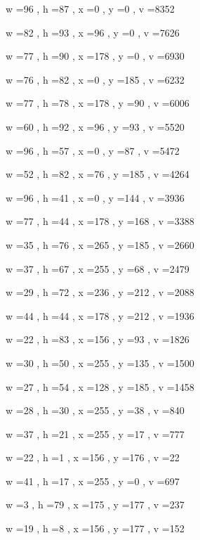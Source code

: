 \documentclass[11pt]{article}
\begin{document}
w =96 , h =87 , x =0 , y =0 , v =8352
\par
w =82 , h =93 , x =96 , y =0 , v =7626
\par
w =77 , h =90 , x =178 , y =0 , v =6930
\par
w =76 , h =82 , x =0 , y =185 , v =6232
\par
w =77 , h =78 , x =178 , y =90 , v =6006
\par
w =60 , h =92 , x =96 , y =93 , v =5520
\par
w =96 , h =57 , x =0 , y =87 , v =5472
\par
w =52 , h =82 , x =76 , y =185 , v =4264
\par
w =96 , h =41 , x =0 , y =144 , v =3936
\par
w =77 , h =44 , x =178 , y =168 , v =3388
\par
w =35 , h =76 , x =265 , y =185 , v =2660
\par
w =37 , h =67 , x =255 , y =68 , v =2479
\par
w =29 , h =72 , x =236 , y =212 , v =2088
\par
w =44 , h =44 , x =178 , y =212 , v =1936
\par
w =22 , h =83 , x =156 , y =93 , v =1826
\par
w =30 , h =50 , x =255 , y =135 , v =1500
\par
w =27 , h =54 , x =128 , y =185 , v =1458
\par
w =28 , h =30 , x =255 , y =38 , v =840
\par
w =37 , h =21 , x =255 , y =17 , v =777
\par
w =22 , h =1 , x =156 , y =176 , v =22
\par
w =41 , h =17 , x =255 , y =0 , v =697
\par
w =3 , h =79 , x =175 , y =177 , v =237
\par
w =19 , h =8 , x =156 , y =177 , v =152
\par
\newpage
\end{document}
